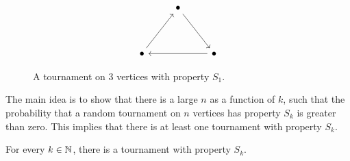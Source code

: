 \begin{figure}
    \centering
    \[\begin{tikzcd}
        & \bullet \\
        \\
        \bullet && \bullet
        \arrow[from=3-1, to=1-2]
        \arrow[from=1-2, to=3-3]
        \arrow[from=3-3, to=3-1]
    \end{tikzcd}\]
    \caption{A tournament on 3 vertices with property $S_1$.}
    \label{fig:tournament}
\end{figure}

The main idea is to show that there is a large $n$ as a function of $k$, such that the probability that a random tournament on $n$ vertices has property $S_k$ is greater than zero. This implies that there is at least one tournament with property $S_k$. \par


\begin{theorem}
    For every $k \in \mathbb{N}$, there is a tournament with property $S_k$. \cite{alon2016probabilistic}
\end{theorem}

